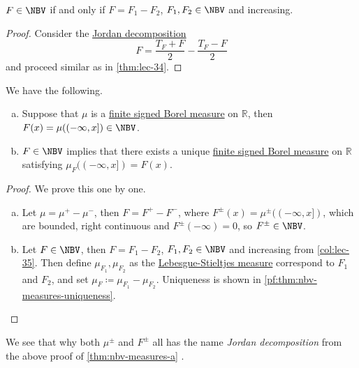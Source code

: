 \begin{corollary}\label{col:lec-35}
	\(F \in \NBV\) if and only if \(F = F_1 - F_2\), \(F_1,F_2 \in \NBV\) and increasing.
\end{corollary}
\begin{proof}
	Consider the \hyperref[def:Jordan-decomposition]{Jordan decomposition}
	\[
		F = \frac{T_{F} +F}{2} - \frac{T_{F} - F}{2}
	\]
	and proceed similar as in \autoref{thm:lec-34}.
\end{proof}

\begin{theorem}\label{thm:nbv-measures}
	We have the following.
	\begin{enumerate}[(a)]
		\item\label{thm:nbv-measures-a} Suppose that \(\mu\) is a \hyperref[def:finite-signed-measure]{finite signed \hyperref[def:Borel-measure]{Borel measure}}
		      on \(\mathbb{R}\), then \(F(x) = \mu((-\infty, x]) \in \NBV\).
		\item\label{thm:nbv-measures-b} \(F \in \NBV\) implies that there exists a unique \hyperref[def:finite-signed-measure]{finite signed \hyperref[def:Borel-measure]{Borel measure}}
		      on \(\mathbb{R}\) satisfying \(\mu_F((-\infty,x]) = F(x)\).
	\end{enumerate}
\end{theorem}
\begin{proof}
	We prove this one by one.
	\begin{enumerate}[(a)]
		\item Let \(\mu = \mu^+ - \mu^-\), then \(F = F^+ - F^-\), where \(F^{\pm}(x) = \mu^{\pm}((-\infty,x])\), which are bounded,
		      right continuous and \(F^{\pm}(-\infty) = 0\), so \(F^{\pm} \in \NBV\).
		\item Let \(F \in \NBV\), then \(F = F_1 - F_2\), \(F_1,F_2 \in \NBV\) and increasing from \autoref{col:lec-35}. Then define \(\mu_{F_1},\mu_{F_2}\) as the
		      \hyperref[def:Lebesgue-Stieltjes-measure]{Lebesgue-Stieltjes measure} correspond to \(F_1\) and \(F_2\), and set
		      \(\mu_F \coloneqq \mu_{F_1} - \mu_{F_2}\). Uniqueness is shown in \autoref{pf:thm:nbv-measures-uniqueness}.
	\end{enumerate}
\end{proof}

\begin{remark}
	We see that why both \(\mu ^\pm\) and \(F^\pm\) all has the name \emph{Jordan decomposition} from the above proof of \autoref{thm:nbv-measures-a} .
\end{remark}


